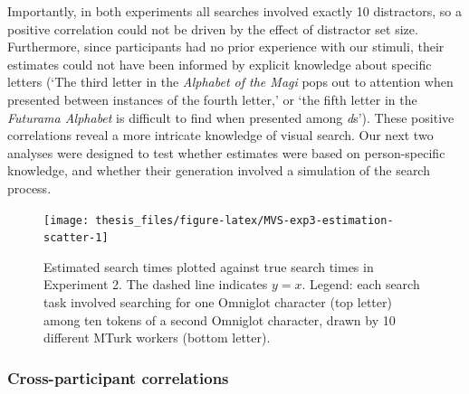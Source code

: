 \documentclass[12pt,twoside]{reedthesis}
\begin{document}
Importantly, in both experiments all searches involved exactly 10 distractors, so a positive correlation could not be driven by the effect of distractor set size. Furthermore, since participants had no prior experience with our stimuli, their estimates could not have been informed by explicit knowledge about specific letters (`The third letter in the \emph{Alphabet of the Magi} pops out to attention when presented between instances of the fourth letter,' or `the fifth letter in the \emph{Futurama Alphabet} is difficult to find when presented among \emph{d}s'). These positive correlations reveal a more intricate knowledge of visual search. Our next two analyses were designed to test whether estimates were based on person-specific knowledge, and whether their generation involved a simulation of the search process.
\begin{figure}
\texttt{[image: thesis\_files/figure-latex/MVS-exp3-estimation-scatter-1]} \caption[Search time estimates accuracy, Experiment 3]{Estimated search times plotted against true search times in Experiment 2. The dashed line indicates $y=x$. Legend: each search task involved searching for one Omniglot character (top letter) among ten tokens of a second Omniglot character, drawn by 10 different MTurk workers (bottom letter).}\label{fig:MVS-exp3-estimation-scatter}
\end{figure}
\hypertarget{selfself}{%
\subsubsection*{Cross-participant correlations}\label{selfself}}
\end{document}
